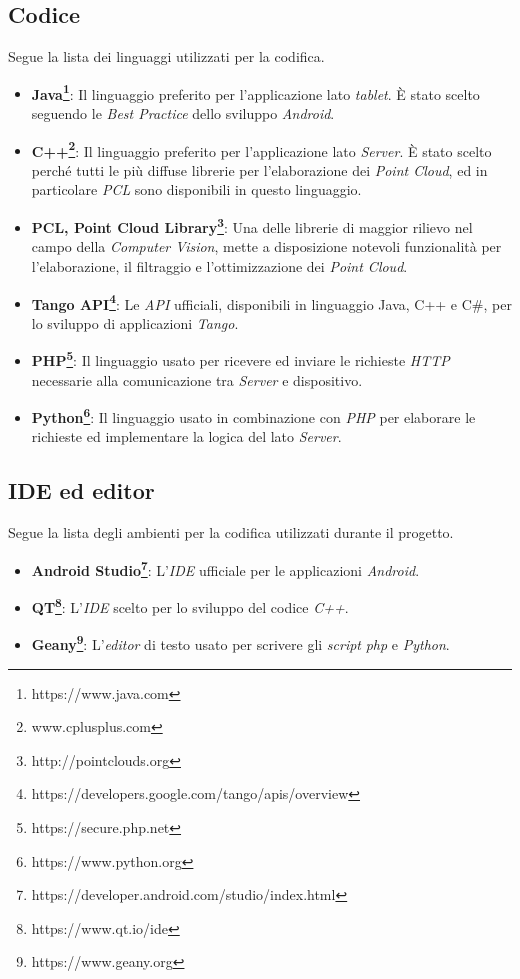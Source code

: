 \subsection{Codice}
Segue la lista dei linguaggi utilizzati per la codifica.
\begin{itemize}
	\item \textbf{Java\footnote{https://www.java.com}}: Il linguaggio preferito per l'applicazione lato \emph{tablet}. È stato scelto seguendo le \emph{Best Practice} dello sviluppo \emph{Android}.
	\item \textbf{C++\footnote{www.cplusplus.com}}: Il linguaggio preferito per l'applicazione lato \emph{Server}. È stato scelto perché tutti le più diffuse librerie per l'elaborazione dei \emph{Point Cloud}, ed in particolare \emph{PCL} sono disponibili in questo linguaggio.
	\item \textbf{PCL, Point Cloud Library\footnote{http://pointclouds.org}}: Una delle librerie di maggior rilievo nel campo della \emph{Computer Vision}, mette a disposizione notevoli funzionalità per l'elaborazione, il filtraggio e l'ottimizzazione dei \emph{Point Cloud}.
	\item \textbf{Tango API\footnote{https://developers.google.com/tango/apis/overview}}: Le \emph{API} ufficiali, disponibili in linguaggio Java, C++ e C\#, per lo sviluppo di applicazioni \emph{Tango}.
	\item \textbf{PHP\footnote{https://secure.php.net}}: Il linguaggio usato per ricevere ed inviare le richieste \emph{HTTP} necessarie alla comunicazione tra \emph{Server} e dispositivo.
	\item \textbf{Python\footnote{https://www.python.org}}: Il linguaggio usato in combinazione con \emph{PHP} per elaborare le richieste ed implementare la logica del lato \emph{Server}.
\end{itemize}

\newpage
\subsection{IDE ed editor}
Segue la lista degli ambienti per la codifica utilizzati durante il progetto.
\begin{itemize}
	\item \textbf{Android Studio\footnote{https://developer.android.com/studio/index.html}}: L'\emph{IDE} ufficiale per le applicazioni \emph{Android}.
	\item \textbf{QT\footnote{https://www.qt.io/ide}}: L'\emph{IDE} scelto per lo sviluppo del codice \emph{C++}.
	\item \textbf{Geany\footnote{https://www.geany.org}}: L'\emph{editor} di testo usato per scrivere gli \emph{script} \emph{php} e \emph{Python}.
\end{itemize}

